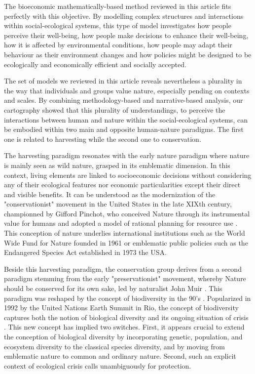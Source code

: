 The bioeconomic mathematically-based method reviewed in this article fits perfectly with this objective. By modelling complex structures and interactions within social-ecological systems, this type of model investigates how people perceive their well-being, how people make decisions to enhance their well-being, how it is affected by environmental conditions, how people may adapt their behaviour as their environment changes and how policies might be designed to be ecologically and economically efficient and socially accepted. 

The set of models we reviewed in this article reveals nevertheless a plurality in the way that individuals and groups value nature, especially pending on contexts and scales. By combining methodology-based and narrative-based analysis, our cartography  showed that this plurality of understandings, to perceive the interactions between human and nature within the social-ecological systems, can be embodied within two main  and opposite human-nature paradigms. The first one is related to harvesting while the second one to conservation.

The harvesting paradigm  resonates with the early nature paradigm where nature is mainly seen as wild nature, grasped in its emblematic dimension. In this context, living elements are linked to socioeconomic decisions without considering any of their ecological features nor economic particularities except their direct and visible benefits. It can be understood as the modernization of the "conservationist" movement in the United States in the late XIXth century, championned by Gifford Pinchot, who conceived Nature through its instrumental value for humans and adopted a model of rational planning for resource use \citep{Banzhaf2019}. This conception of nature underlies international institutions such as the World Wide Fund for Nature founded in 1961 or emblematic public policies such as the Endangered Species Act established in 1973 the USA.


Beside this harvesting paradigm, the  conservation group derives from a second paradigm  stemming from the early "preservationist" movement, whereby Nature should be conserved for its own sake, led by naturalist John Muir \citep{Banzhaf2019}. This paradigm was reshaped by the concept of biodiversity in the 90's . Popularized in 1992 by the United Nations Earth Summit in Rio, the concept of biodiversity captures both the notion of biological diversity and its ongoing situation of crisis \citep{Robin2011}. This new concept has implied two switches. First, it appears crucial to extend the conception of biological diversity by incorporating genetic, population, and ecosystem diversity to the classical species diversity, and by moving from emblematic nature to common and ordinary nature. Second, such an explicit context of ecological crisis calls unambiguously for protection.

